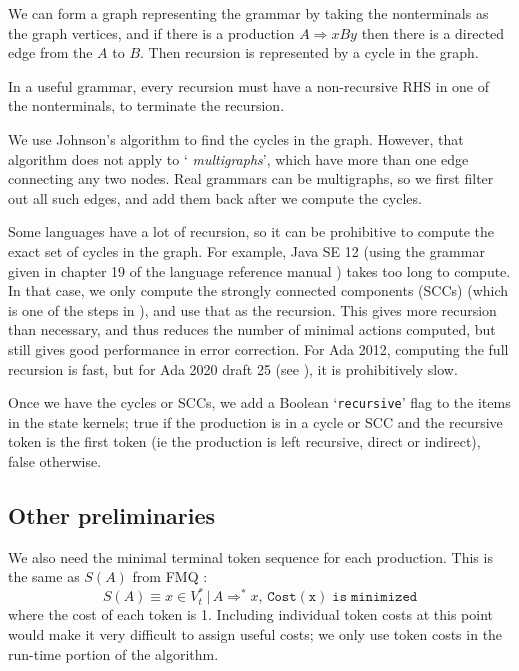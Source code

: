 \documentclass{article}
\newcommand{\code}[1]{`\lstinline|#1|'}
\begin{document}
We can form a graph representing the grammar by taking the
nonterminals as the graph vertices, and if there is a production $A
\Rightarrow xBy$ then there is a directed edge from the $A$ to $B$.
Then recursion is represented by a cycle in the graph.

In a useful grammar, every recursion must have a non-recursive
RHS in one of the nonterminals, to terminate the recursion.

We use Johnson's algorithm \cite{graph-cycles} to find the cycles in
the graph. However, that algorithm does not apply to `{\it
  multigraphs}', which have more than one edge connecting any two
nodes. Real grammars can be multigraphs, so we first filter out all
such edges, and add them back after we compute the cycles.

Some languages have a lot of recursion, so it can be prohibitive to
compute the exact set of cycles in the graph. For example, Java SE 12
(using the grammar given in chapter 19 of the language reference
manual \cite{javarm}) takes too long to compute. In that case, we only
compute the strongly connected components (SCCs) (which is one of the
steps in \cite{graph-cycles}), and use that as the recursion. This
gives more recursion than necessary, and thus reduces the number of
minimal actions computed, but still gives good performance in error
correction. For Ada 2012, computing the full recursion is fast, but
for Ada 2020 draft 25 (see \cite{Ada 2020}), it is prohibitively slow.

Once we have the cycles or SCCs, we add a Boolean \code{recursive}
flag to the items in the state kernels; true if the production is in a
cycle or SCC and the recursive token is the first token (ie the
production is left recursive, direct or indirect), false otherwise.

\subsection{Other preliminaries}
We also need the minimal terminal token sequence for each production.
This is the same as $S(A)$ from FMQ \cite{FMQ 1980}:
\begin{equation}
S(A) \equiv x \in V_t^* \, |\, A \Rightarrow^* x, \, \mathtt{Cost(x)\; is\; minimized}
\end{equation}
where the cost of each token is 1. Including individual token costs at
this point would make it very difficult to assign useful costs; we
only use token costs in the run-time portion of the algorithm.
\end{document}

